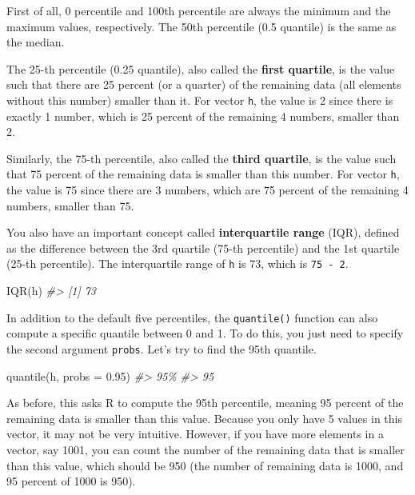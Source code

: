 \documentclass[
]{book}
\newenvironment{Shaded}{\begin{snugshade}}{\end{snugshade}}
\newcommand{\AttributeTok}[1]{\textcolor[rgb]{0.77,0.63,0.00}{#1}}
\newcommand{\CommentTok}[1]{\textcolor[rgb]{0.56,0.35,0.01}{\textit{#1}}}
\newcommand{\FloatTok}[1]{\textcolor[rgb]{0.00,0.00,0.81}{#1}}
\newcommand{\FunctionTok}[1]{\textcolor[rgb]{0.00,0.00,0.00}{#1}}
\newcommand{\NormalTok}[1]{#1}
\begin{document}
First of all, 0 percentile and 100th percentile are always the minimum and the maximum values, respectively. The 50th percentile (0.5 quantile) is the same as the median.

The 25-th percentile (0.25 quantile), also called the \textbf{first quartile}, is the value such that there are 25 percent (or a quarter) of the remaining data (all elements without this number) smaller than it. For vector \texttt{h}, the value is 2 since there is exactly 1 number, which is 25 percent of the remaining 4 numbers, smaller than 2.

Similarly, the 75-th percentile, also called the \textbf{third quartile}, is the value such that 75 percent of the remaining data is smaller than this number. For vector \texttt{h}, the value is 75 since there are 3 numbers, which are 75 percent of the remaining 4 numbers, smaller than 75.

You also have an important concept called \textbf{interquartile range} (IQR), defined as the difference between the 3rd quartile (75-th percentile) and the 1st quartile (25-th percentile). The interquartile range of \texttt{h} is 73, which is \texttt{75\ -\ 2}.

\begin{Shaded}
\begin{Highlighting}[]
\FunctionTok{IQR}\NormalTok{(h)}
\CommentTok{\#\textgreater{} [1] 73}
\end{Highlighting}
\end{Shaded}

In addition to the default five percentiles, the \texttt{quantile()} function can also compute a specific quantile between 0 and 1. To do this, you just need to specify the second argument \texttt{probs}. Let's try to find the 95th quantile.

\begin{Shaded}
\begin{Highlighting}[]
\FunctionTok{quantile}\NormalTok{(h, }\AttributeTok{probs =} \FloatTok{0.95}\NormalTok{)}
\CommentTok{\#\textgreater{} 95\% }
\CommentTok{\#\textgreater{}  95}
\end{Highlighting}
\end{Shaded}

As before, this asks R to compute the 95th percentile, meaning 95 percent of the remaining data is smaller than this value. Because you only have 5 values in this vector, it may not be very intuitive. However, if you have more elements in a vector, say 1001, you can count the number of the remaining data that is smaller than this value, which should be 950 (the number of remaining data is 1000, and 95 percent of 1000 is 950).
\end{document}
